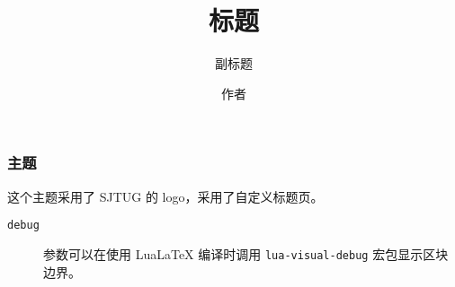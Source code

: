 \documentclass{ctexbeamer}
\begin{document}
\title{标题}
\subtitle{副标题}
\author{作者}
\maketitle
\begin{frame}
  \frametitle{\sjtugtext 主题}
  这个主题采用了 SJTUG 的 logo，采用了自定义标题页。

  \begin{description}
    \item[\texttt{debug}] 参数可以在使用 Lua\LaTeX{} 编译时调用 \texttt{lua-visual-debug} 宏包显示区块边界。
  \end{description}
\end{frame}
\makebottom
\end{document}
